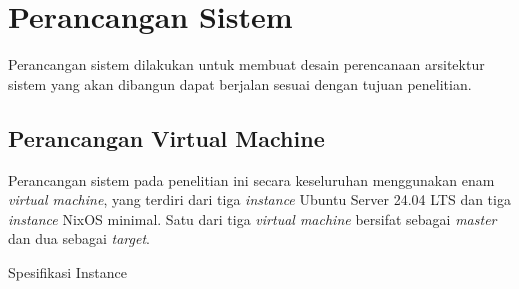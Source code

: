 \documentclass[10pt,]{report}
\begin{document}
\section{Perancangan Sistem}
\vspace{-3mm}
\begin{adjustwidth}{20pt}{}
	Perancangan sistem dilakukan untuk membuat desain perencanaan arsitektur
	sistem yang akan dibangun dapat berjalan sesuai dengan tujuan penelitian.
	\subsection{Perancangan Virtual Machine}
	\begin{adjustwidth}{20pt}{}
		Perancangan sistem pada penelitian ini secara keseluruhan menggunakan enam
		\textit{virtual machine}, yang terdiri dari tiga \textit{instance} Ubuntu
		Server 24.04 LTS dan tiga \textit{instance} NixOS minimal.
		Satu dari tiga \textit{virtual machine} bersifat sebagai \textit{master}
		dan dua sebagai \textit{target}.
	\end{adjustwidth}
	\begin{table}[!htbp]
		\caption{Spesifikasi Instance}
		\begin{center}


\end{center}
\end{table}
\end{adjustwidth}
\end{document}
